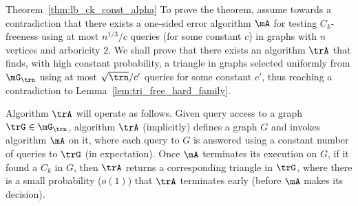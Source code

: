 \begin{proofof}{Theorem~\ref{thm:lb_ck_const_alpha}}
To prove the theorem, assume towards a contradiction that there exists a one-sided error algorithm $\mA$ for testing $C_k$-freeness using at most %
$n^{1/3}/c$ queries  (for some constant $c$)
in graphs with $n$ vertices and arboricity $2$.
We shall prove that  there exists an algorithm $\trA$ that %
finds, with high constant probability, a triangle in graphs selected uniformly from $\mG_{\trn}$ using at most $\sqrt{\trn}/c'$ queries 
 for some constant $c'$, thus reaching a contradiction to Lemma~\ref{lem:tri_free_hard_family}.

Algorithm $\trA$ will operate as follows. Given query access to a graph $\trG\in \mG_{\trn}$, algorithm $\trA$ (implicitly) defines a graph $G$ and invokes algorithm $\mA$ on it, where each query to $G$ is answered using a constant number of queries to $\trG$ (in expectation). 
Once $\mA$ terminates its execution on $G$, 
if it found  a $C_k$ in $G$, 
then $\trA$ returns a corresponding triangle in $\trG$, 
where there is a small  probability ($o(1)$) that $\trA$ terminates early (before $\mA$ makes its decision). 


\end{proofof}
